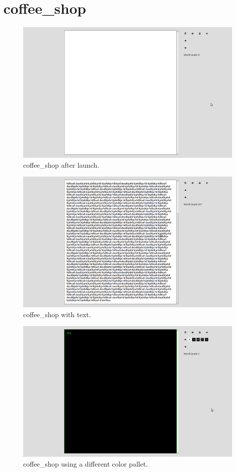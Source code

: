 \documentclass[10pt]{article}
\begin{document}
\section{coffee\_shop}

\begin{figure}
   \centering
      \includegraphics[width=130mm]{images/coffee_shop1.png}
   \caption{coffee\_shop after launch.}
\end{figure}

\begin{figure}
   \centering
      \includegraphics[width=130mm]{images/coffee_shop2.png}
   \caption{coffee\_shop with text.}
\end{figure}

\begin{figure}
   \centering
      \includegraphics[width=130mm]{images/coffee_shop3.png}
   \caption{coffee\_shop using a different color pallet.}
\end{figure}
\end{document}
